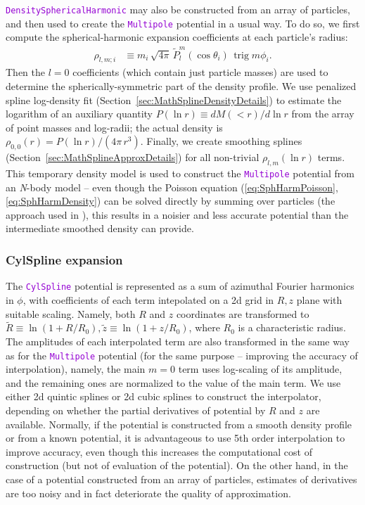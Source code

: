 \documentclass[12pt]{article}
\newcommand{\Nbody}{\textsl{N}-body\xspace}
\newcommand{\ttt}[1]{\textcolor{darkviolet}{\texttt{#1}}}
\DeclareMathOperator{\trig}{trig}
\begin{document}
\ttt{DensitySphericalHarmonic} may also be constructed from an array of particles, and then used to create the \ttt{Multipole} potential in a usual way. To do so, we first compute the spherical-harmonic expansion coefficients at each particle's radius:
\begin{align*}
\rho_{l,m;i} &\equiv m_i\,\sqrt{4\pi}\,\tilde P_l^m(\cos\theta_i)\,\trig m\phi_i .
\end{align*}
Then the $l=0$ coefficients (which contain just particle masses) are used to determine the spherically-symmetric part of the density profile. We use penalized spline log-density fit (Section~\ref{sec:MathSplineDensityDetails}) to estimate the logarithm of an auxiliary quantity $P(\ln r) \equiv dM(<r)/d\ln r$ from the array of point masses and log-radii; the actual density is $\rho_{0,0}(r) = P(\ln r) / (4\pi\,r^3)$. Finally, we create smoothing splines (Section~\ref{sec:MathSplineApproxDetails}) for all non-trivial $\rho_{l,m}(\ln r)$ terms.
This temporary density model is used to construct the \ttt{Multipole} potential from an \Nbody model -- even though the Poisson equation (\ref{eq:SphHarmPoisson},\ref{eq:SphHarmDensity}) can be solved directly by summing over particles (the approach used in \cite{Vasiliev2013}), this results in a noisier and less accurate potential than the intermediate smoothed density can provide.

\subsubsection{CylSpline expansion}  \label{sec:PotentialCylSplineDetails}

The \ttt{CylSpline} potential is represented as a sum of azimuthal Fourier harmonics in $\phi$, with coefficients of each term intepolated on a 2d grid in $R,z$ plane with suitable scaling.
Namely, both $R$ and $z$ coordinates are transformed to $\tilde R \equiv \ln(1+R/R_0), \tilde z \equiv \ln(1+z/R_0)$, where $R_0$ is a characteristic radius. The amplitudes of each interpolated term are also transformed in the same way as for the \ttt{Multipole} potential (for the same purpose -- improving the accuracy of interpolation), namely, the main $m=0$ term uses log-scaling of its amplitude, and the remaining ones are normalized to the value of the main term. We use either 2d quintic splines or 2d cubic splines to construct the interpolator, depending on whether the partial derivatives of potential by $R$ and $z$ are available. Normally, if the potential is constructed from a smooth density profile or from a known potential, it is advantageous to use 5th order interpolation to improve accuracy, even though this increases the computational cost of construction (but not of evaluation of the potential). On the other hand, in the case of a potential constructed from an array of particles, estimates of derivatives are too noisy and in fact deteriorate the quality of approximation.
\end{document}
